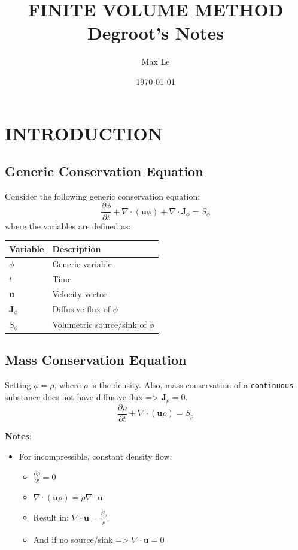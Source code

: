 \documentclass[11pt]{article}
\author{Max Le}
\date{\today}
\title{FINITE VOLUME METHOD \\ Degroot's Notes}
\begin{document}
\maketitle
\tableofcontents


\setlength\parindent{0pt}

\renewcommand{\arraystretch}{2}
\renewcommand{\footrulewidth}{0.4pt}%
\newpage


\section{INTRODUCTION}
\label{sec:org0a0e59b}
\subsection{Generic Conservation Equation}
\label{sec:orgee4a651}
Consider the following generic conservation equation:
\begin{equation}
\frac{\partial \phi}{\partial t} + \nabla \cdot (\textbf{u}\phi) + \nabla \cdot \textbf{J}_\phi = S_\phi
\end{equation}
where the variables are defined as:


\begin{center}
\begin{tabular}{ll}
\textbf{Variable} & \textbf{Description}\\
\hline
\(\phi\) & Generic variable\\
\(t\) & Time\\
\textbf{u} & Velocity vector\\
\(\textbf{J}_\phi\) & Diffusive flux of \(\phi\)\\
\(S_\phi\) & Volumetric source/sink of \(\phi\)\\
\hline
\end{tabular}
\end{center}

\subsection{Mass Conservation Equation}
\label{sec:orgdf4a976}
Setting \(\phi = \rho\), where \(\rho\) is the density. Also, mass conservation of a \texttt{continuous} substance does not
have diffusive flux => \(\textbf{J}_\rho = 0\).
\begin{equation}
\frac{\partial \rho}{\partial t} + \nabla \cdot (\textbf{u}\rho) = S_\rho
\end{equation}

\textbf{Notes}:
\begin{itemize}
\item For incompressible, constant density flow:
\begin{itemize}
\item \(\frac{\partial \rho}{\partial t} = 0\)
\item \(\nabla \cdot (\textbf{u}\rho) = \rho \nabla \cdot \textbf{u}\)
\item Result in: \(\nabla \cdot \textbf{u} = \frac{S_\rho}{\rho}\)
\item And if no source/sink => \(\nabla \cdot \textbf{u} = 0\)
\end{itemize}
\end{itemize}
\end{document}
